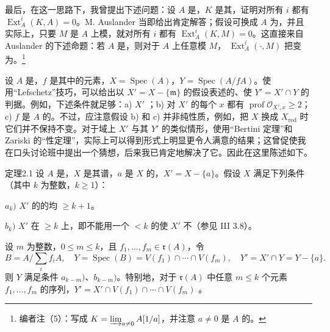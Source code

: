 最后，在这一思路下，我曾提出下述问题：设 $A$ 是，$K$ 是其，证明对所有 $i$ 都有 $\operatorname{Ext}^i_A(K,A)=0$。M. Auslander 当即给出肯定解答；假设可换成 $A$ 为，并且实际上，只要 $M$ 是 $A$ 上模，就对所有 $i$ 都有 $\operatorname{Ext}^i_A(K,M)=0$。这直接来自 Auslander 的下述命题：若 $A$ 是，则对于 $A$ 上任意模 $M$， $\operatorname{Ext}^i_A(\mathord\cdot,M)$ 把变为。\footnote{编者注（5）：写成 $K=\varinjlim_{a\ne0}A[1/a]$，并注意 $a\ne0$ 是 $A$ 的。}

设 $A$ 是，$f$ 是其中的元素，$X=\operatorname{Spec}(A)$，$Y=\operatorname{Spec}(A/fA)$。使用“Lefschetz”技巧，可以给出以 $X'=X-\{\mathfrak m\}$ 的假设表述的、使 $Y'=X'\cap Y$ 的判据。例如，下述条件就足够：a) $X'$ ；b) 对 $X'$ 的每个 $x$ 都有 $\operatorname{prof}\mathcal O_{X',x}\geq2$；c) $f$ 是 $A$ 的。不过，应注意假设 b) 和 c) 并非纯性质，例如，把 $X$ 换成 $X_{\mathrm{red}}$ 时它们并不保持不变。对于域上 $X'$ 与其 $Y'$ 的类似情形，使用“Bertini 定理”和 Zariski 的“性定理”，实际上可以得到形式上明显更令人满意的结果；这曾促使我在口头讨论班中提出一个猜想，后来我已肯定地解决了它。因此在这里陈述如下。

\begin{SGAresult}{定理}{2.1}
设 $A$ 是，$X$ 是其谱，$a$ 是 $X$ 的，$X'=X-\{a\}$。假设 $X$ 满足下列条件（其中 $k$ 为整数，$k\geq1$）：

$a_k)$ $X'$ 的的均 $\geq k+1$。

$b_k)$ $X'$ 在 $\geq k$ 上，即不能用一个 $<k$ 的使 $X'$ 不（参见 III 3.8）。

设 $m$ 为整数，$0\leq m\leq k$，且 $f_1,\ldots,f_m\in\mathfrak r(A)$，令
\[
B=A/\sum_i f_iA,\quad Y=\operatorname{Spec}(B)=V(f_1)\cap\cdots\cap V(f_m),
\quad Y'=X'\cap Y=Y-\{a\}.
\]
则 $Y$ 满足条件 $a_{k-m})$、$b_{k-m})$。特别地，对于 $\mathfrak r(A)$ 中任意 $m\leq k$ 个元素 $f_1,\ldots,f_m$ 的序列，$Y'=X'\cap V(f_1)\cap\cdots\cap V(f_m)$ 。
\end{SGAresult}


